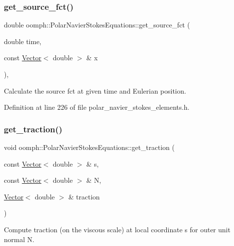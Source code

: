 \subsubsection{\texorpdfstring{get\+\_\+source\+\_\+fct()}{get\_source\_fct()}}
{\footnotesize\ttfamily double oomph\+::\+Polar\+Navier\+Stokes\+Equations\+::get\+\_\+source\+\_\+fct (\begin{DoxyParamCaption}\item[{double}]{time,  }\item[{const \hyperlink{classoomph_1_1Vector}{Vector}$<$ double $>$ \&}]{x }\end{DoxyParamCaption})\hspace{0.3cm}{\ttfamily [inline]}, {\ttfamily [protected]}}



Calculate the source fct at given time and Eulerian position. 



Definition at line 226 of file polar\+\_\+navier\+\_\+stokes\+\_\+elements.\+h.

\mbox{\label{classoomph_1_1PolarNavierStokesEquations_a535d5104145a0ebb128c850c5d87d3c4}} 
\subsubsection{\texorpdfstring{get\+\_\+traction()}{get\_traction()}}
{\footnotesize\ttfamily void oomph\+::\+Polar\+Navier\+Stokes\+Equations\+::get\+\_\+traction (\begin{DoxyParamCaption}\item[{const \hyperlink{classoomph_1_1Vector}{Vector}$<$ double $>$ \&}]{s,  }\item[{const \hyperlink{classoomph_1_1Vector}{Vector}$<$ double $>$ \&}]{N,  }\item[{\hyperlink{classoomph_1_1Vector}{Vector}$<$ double $>$ \&}]{traction }\end{DoxyParamCaption})}



Compute traction (on the viscous scale) at local coordinate s for outer unit normal N. 




